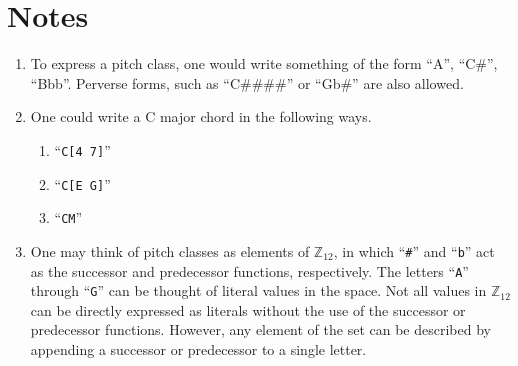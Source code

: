 \documentclass{article}
\begin{document}
\section{Notes}
\begin{enumerate}
\item To express a pitch class, one would write something of the form ``A'', ``C\#'', ``Bbb''. Perverse forms, such as ``C\#\#\#\#'' or ``Gb\#'' are also allowed.
\item One could write a C major chord in the following ways.
\begin{enumerate}
\item ``\texttt{C[4 7]}''
\item ``\texttt{C[E G]}''
\item ``\texttt{CM}''
\end{enumerate}



\item One may think of pitch classes as elements of $\mathbb{Z}_{12}$, in which ``\texttt{\#}'' and ``\texttt{b}'' act as the successor and predecessor functions, respectively. The letters ``\texttt{A}'' through ``\texttt{G}'' can be thought of literal values in the space. Not all values in $\mathbb{Z}_{12}$ can be directly expressed as literals without the use of the successor or predecessor functions. However, any element of the set can be described by appending a successor or predecessor to a single letter.
\end{enumerate}
\end{document}
